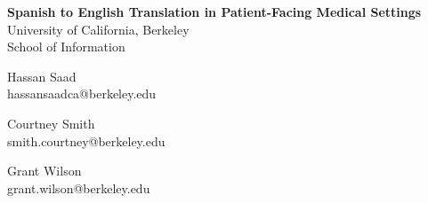 \documentclass{article}
\DeclareRobustCommand{\maketitle}{%
  \begingroup
  \centering
    \Large\textbf{Spanish to English Translation in Patient-Facing Medical Settings}\\[\medskipamount]
    \large{University of California, Berkeley \\ School of Information}\par
  \endgroup
  \par
  \vspace{1.5\baselineskip plus 5pt minus 5pt}
}
\begin{document}
\maketitle

\begin{multicols}{3}
Hassan Saad \\ \small{hassansaadca@berkeley.edu}

\columnbreak

Courtney Smith \\ \small{smith.courtney@berkeley.edu}

\columnbreak

Grant Wilson \\ \small{grant.wilson@berkeley.edu}

\end{multicols}

\medskipamount
\end{document}
